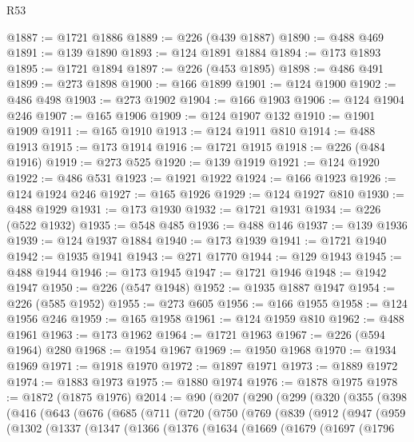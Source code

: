 \begin{lexlean}{R53}
\begin{coremodule}
@1887 := @1721 @1886
@1889 := @226 (@439 @1887)
@1890 := @488 @469
@1891 := @139 @1890
@1893 := @124 @1891 @1884
@1894 := @173 @1893
@1895 := @1721 @1894
@1897 := @226 (@453 @1895)
@1898 := @486 @491
@1899 := @273 @1898
@1900 := @166 @1899
@1901 := @124 @1900
@1902 := @486 @498
@1903 := @273 @1902
@1904 := @166 @1903
@1906 := @124 @1904 @246
@1907 := @165 @1906
@1909 := @124 @1907 @132
@1910 := @1901 @1909
@1911 := @165 @1910
@1913 := @124 @1911 @810
@1914 := @488 @1913
@1915 := @173 @1914
@1916 := @1721 @1915
@1918 := @226 (@484 @1916)
@1919 := @273 @525
@1920 := @139 @1919
@1921 := @124 @1920
@1922 := @486 @531
@1923 := @1921 @1922
@1924 := @166 @1923
@1926 := @124 @1924 @246
@1927 := @165 @1926
@1929 := @124 @1927 @810
@1930 := @488 @1929
@1931 := @173 @1930
@1932 := @1721 @1931
@1934 := @226 (@522 @1932)
@1935 := @548 @485
@1936 := @488 @146
@1937 := @139 @1936
@1939 := @124 @1937 @1884
@1940 := @173 @1939
@1941 := @1721 @1940
@1942 := @1935 @1941
@1943 := @271 @1770
@1944 := @129 @1943
@1945 := @488 @1944
@1946 := @173 @1945
@1947 := @1721 @1946
@1948 := @1942 @1947
@1950 := @226 (@547 @1948)
@1952 := @1935 @1887 @1947
@1954 := @226 (@585 @1952)
@1955 := @273 @605
@1956 := @166 @1955
@1958 := @124 @1956 @246
@1959 := @165 @1958
@1961 := @124 @1959 @810
@1962 := @488 @1961
@1963 := @173 @1962
@1964 := @1721 @1963
@1967 := @226 (@594 @1964) @280
@1968 := @1954 @1967
@1969 := @1950 @1968
@1970 := @1934 @1969
@1971 := @1918 @1970
@1972 := @1897 @1971
@1973 := @1889 @1972
@1974 := @1883 @1973
@1975 := @1880 @1974
@1976 := @1878 @1975
@1978 := @1872 (@1875 @1976)
@2014 := @90
    (@207
      (@290
        (@299
          (@320
            (@355
              (@398
                (@416
                  (@643
                    (@676
                      (@685
                        (@711
                          (@720
                            (@750
                              (@769
                                (@839
                                  (@912
                                    (@947
                                      (@959
                                        (@1302
                                          (@1337
                                            (@1347
                                              (@1366
                                                (@1376
                                                  (@1634
                                                    (@1669
                                                      (@1679
                                                        (@1697
                                                          (@1796

\end{coremodule}
\end{lexlean}
